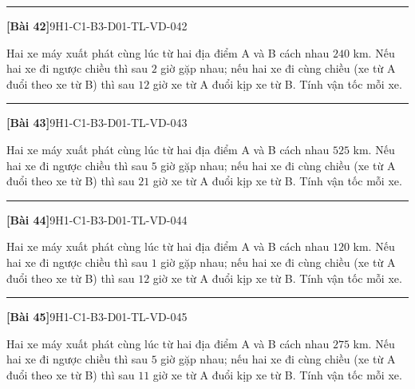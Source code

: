 \documentclass[12pt,a4paper]{article}
\newif\ifloigiai
\newenvironment{cauhoi}[2]{%
  \par\medskip\noindent\rule{\textwidth}{0.4pt}\par\nopagebreak
  \noindent\textbf{[#1]}\hfill{\scriptsize\ttfamily #2}\par\nopagebreak\smallskip}{\par}
\newcommand{\loigiai}[1]{\ifloigiai\par\smallskip\noindent\textit{Lời giải.} #1\par\fi}
\begin{document}
\begin{cauhoi}{Bài 42}{9H1-C1-B3-D01-TL-VD-042}
Hai xe máy xuất phát cùng lúc từ hai địa điểm A và B cách nhau $240$ km. Nếu hai xe đi ngược chiều thì sau $2$ giờ gặp nhau; nếu hai xe đi cùng chiều (xe từ A đuổi theo xe từ B) thì sau $12$ giờ xe từ A đuổi kịp xe từ B. Tính vận tốc mỗi xe.
\loigiai{Gọi vận tốc xe từ A là $x$ (km/h) và xe từ B là $y$ (km/h), $x>y>0$. Đi ngược chiều: $2(x+y)=240$, tức là $x+y=120$. Đi cùng chiều: $12(x-y)=240$, tức là $x-y=20$. Giải hệ ta được $x=70$, $y=50$ (thoả mãn). Vậy vận tốc xe từ A là 70 km/h, xe từ B là 50 km/h.}
\end{cauhoi}
\begin{cauhoi}{Bài 43}{9H1-C1-B3-D01-TL-VD-043}
Hai xe máy xuất phát cùng lúc từ hai địa điểm A và B cách nhau $525$ km. Nếu hai xe đi ngược chiều thì sau $5$ giờ gặp nhau; nếu hai xe đi cùng chiều (xe từ A đuổi theo xe từ B) thì sau $21$ giờ xe từ A đuổi kịp xe từ B. Tính vận tốc mỗi xe.
\loigiai{Gọi vận tốc xe từ A là $x$ (km/h) và xe từ B là $y$ (km/h), $x>y>0$. Đi ngược chiều: $5(x+y)=525$, tức là $x+y=105$. Đi cùng chiều: $21(x-y)=525$, tức là $x-y=25$. Giải hệ ta được $x=65$, $y=40$ (thoả mãn). Vậy vận tốc xe từ A là 65 km/h, xe từ B là 40 km/h.}
\end{cauhoi}
\begin{cauhoi}{Bài 44}{9H1-C1-B3-D01-TL-VD-044}
Hai xe máy xuất phát cùng lúc từ hai địa điểm A và B cách nhau $120$ km. Nếu hai xe đi ngược chiều thì sau $1$ giờ gặp nhau; nếu hai xe đi cùng chiều (xe từ A đuổi theo xe từ B) thì sau $12$ giờ xe từ A đuổi kịp xe từ B. Tính vận tốc mỗi xe.
\loigiai{Gọi vận tốc xe từ A là $x$ (km/h) và xe từ B là $y$ (km/h), $x>y>0$. Đi ngược chiều: $(x+y)=120$, tức là $x+y=120$. Đi cùng chiều: $12(x-y)=120$, tức là $x-y=10$. Giải hệ ta được $x=65$, $y=55$ (thoả mãn). Vậy vận tốc xe từ A là 65 km/h, xe từ B là 55 km/h.}
\end{cauhoi}
\begin{cauhoi}{Bài 45}{9H1-C1-B3-D01-TL-VD-045}
Hai xe máy xuất phát cùng lúc từ hai địa điểm A và B cách nhau $275$ km. Nếu hai xe đi ngược chiều thì sau $5$ giờ gặp nhau; nếu hai xe đi cùng chiều (xe từ A đuổi theo xe từ B) thì sau $11$ giờ xe từ A đuổi kịp xe từ B. Tính vận tốc mỗi xe.
\loigiai{Gọi vận tốc xe từ A là $x$ (km/h) và xe từ B là $y$ (km/h), $x>y>0$. Đi ngược chiều: $5(x+y)=275$, tức là $x+y=55$. Đi cùng chiều: $11(x-y)=275$, tức là $x-y=25$. Giải hệ ta được $x=40$, $y=15$ (thoả mãn). Vậy vận tốc xe từ A là 40 km/h, xe từ B là 15 km/h.}
\end{cauhoi}
\end{document}
